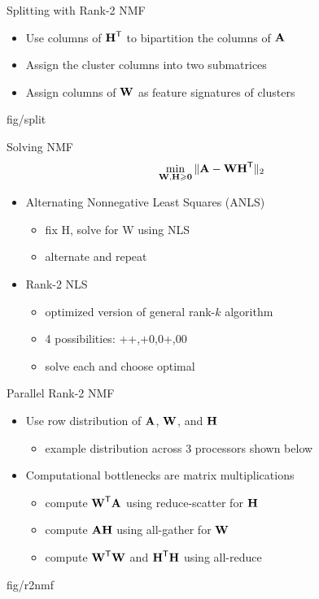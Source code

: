 \documentclass{beamer}
\begin{document}
\begin{frame}{Splitting with Rank-2 NMF}
    \begin{itemize}
        \item Use columns of $\M{H}^\Tra$ to bipartition the columns of $\M{A}$
        \item Assign the cluster columns into two submatrices
        \item Assign columns of $\M{W}$ as feature signatures of clusters
    \end{itemize}
    \begin{adjustbox}{max totalsize={.7\textwidth}{.6\textheight},center}
        {fig/split}
    \end{adjustbox}
\end{frame}

\begin{frame}{Solving NMF}
    $$\min_{\M{W},\M{H}\geq \M{0}} \|\M{A} - \M{W}\M{H}^\Tra\|_2$$
    \begin{itemize}
        \item Alternating Nonnegative Least Squares (ANLS)
        \begin{itemize}
            \item fix H, solve for W using NLS
            \item alternate and repeat
        \end{itemize}
        \vfill
        \item Rank-2 NLS
        \begin{itemize}
            \item optimized version of general rank-$k$ algorithm
            \item 4 possibilities: ++,+0,0+,00
            \item solve each and choose optimal
        \end{itemize}
    \end{itemize}
\end{frame}

\begin{frame}{Parallel Rank-2 NMF}
    \begin{itemize}
        \item Use row distribution of $\M{A}$, $\M{W}$, and $\M{H}$ 
        \begin{itemize}
        		\item example distribution across 3 processors shown below
        \end{itemize}
        \vfill
        \item Computational bottlenecks are matrix multiplications
        \begin{itemize}
            \item compute $\M{W}^\Tra\M{A}$ using reduce-scatter for $\M{H}$
            \item compute $\M{A}\M{H}$ using all-gather for $\M{W}$
            \item compute $\M{W}^\Tra\M{W}$ and $\M{H}^\Tra\M{H}$ using all-reduce
        \end{itemize}
    \end{itemize}
    {fig/r2nmf}
\end{frame}
\end{document}
